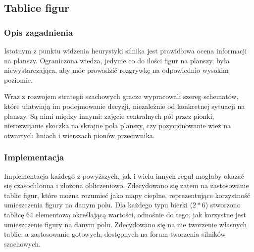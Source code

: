 \subsection{Tablice figur}
\label{subsec:tablice-figur}

\subsubsection{Opis zagadnienia}
Istotnym z punktu widzenia heurystyki silnika jest prawidłowa ocena informacji na planszy.
Ograniczona wiedza, jedynie co do ilości figur na planszy, była niewystarczająca, aby móc prowadzić rozgrywkę na odpowiednio wysokim poziomie.

Wraz z rozwojem strategii szachowych gracze wypracowali szereg schematów, które ułatwiają im podejmowanie decyzji, niezależnie od konkretnej sytuacji na planszy.
Są nimi między innymi: zajęcie centralnych pól przez pionki, nierozwijanie skoczka na skrajne pola planszy, czy pozycjonowanie wież na otwartych liniach i wierszach pionów przeciwnika.

\subsubsection{Implementacja}
Implementacja każdego z powyższych, jak i wielu innych reguł mogłaby okazać się czasochłonna i złożona obliczeniowo.
Zdecydowano się zatem na zastosowanie tablic figur, które można rozumieć jako mapy cieplne, reprezentujące korzystność umieszczenia figury na danym polu.
Dla każdego typu bierki ($2*6$) stworzono tablicę 64 elementową określającą wartości, odnośnie do tego, jak korzystne jest umieszczenie figury na danym polu.
Zdecydowano się na nie tworzenie własnych tablic, a zastosowanie gotowych, dostępnych na forum tworzenia silników szachowych. \cite*{wiki-tablica-figur}

